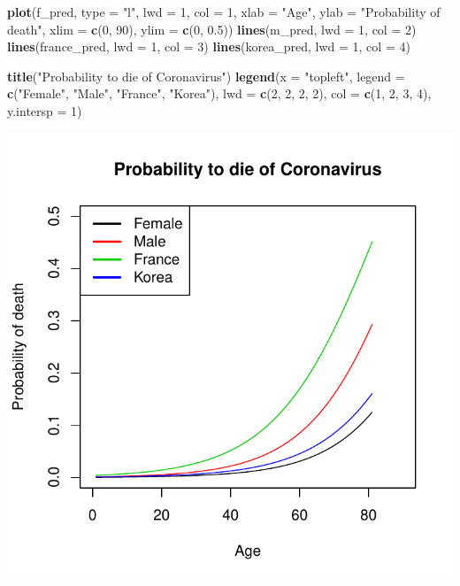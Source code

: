 \documentclass[
]{article}
\newenvironment{Shaded}{\begin{snugshade}}{\end{snugshade}}
\newcommand{\DataTypeTok}[1]{\textcolor[rgb]{0.13,0.29,0.53}{#1}}
\newcommand{\DecValTok}[1]{\textcolor[rgb]{0.00,0.00,0.81}{#1}}
\newcommand{\FloatTok}[1]{\textcolor[rgb]{0.00,0.00,0.81}{#1}}
\newcommand{\KeywordTok}[1]{\textcolor[rgb]{0.13,0.29,0.53}{\textbf{#1}}}
\newcommand{\NormalTok}[1]{#1}
\newcommand{\StringTok}[1]{\textcolor[rgb]{0.31,0.60,0.02}{#1}}
\begin{document}
\begin{Shaded}
\begin{Highlighting}[]
\KeywordTok{plot}\NormalTok{(f_pred, }\DataTypeTok{type =} \StringTok{"l"}\NormalTok{, }\DataTypeTok{lwd =} \DecValTok{1}\NormalTok{, }\DataTypeTok{col =} \DecValTok{1}\NormalTok{, }\DataTypeTok{xlab =} \StringTok{"Age"}\NormalTok{, }\DataTypeTok{ylab =} \StringTok{"Probability of death"}\NormalTok{, }
    \DataTypeTok{xlim =} \KeywordTok{c}\NormalTok{(}\DecValTok{0}\NormalTok{, }\DecValTok{90}\NormalTok{), }\DataTypeTok{ylim =} \KeywordTok{c}\NormalTok{(}\DecValTok{0}\NormalTok{, }\FloatTok{0.5}\NormalTok{))}
\KeywordTok{lines}\NormalTok{(m_pred, }\DataTypeTok{lwd =} \DecValTok{1}\NormalTok{, }\DataTypeTok{col =} \DecValTok{2}\NormalTok{)}
\KeywordTok{lines}\NormalTok{(france_pred, }\DataTypeTok{lwd =} \DecValTok{1}\NormalTok{, }\DataTypeTok{col =} \DecValTok{3}\NormalTok{)}
\KeywordTok{lines}\NormalTok{(korea_pred, }\DataTypeTok{lwd =} \DecValTok{1}\NormalTok{, }\DataTypeTok{col =} \DecValTok{4}\NormalTok{)}

\KeywordTok{title}\NormalTok{(}\StringTok{"Probability to die of Coronavirus"}\NormalTok{)}
\KeywordTok{legend}\NormalTok{(}\DataTypeTok{x =} \StringTok{"topleft"}\NormalTok{, }\DataTypeTok{legend =} \KeywordTok{c}\NormalTok{(}\StringTok{"Female"}\NormalTok{, }\StringTok{"Male"}\NormalTok{, }\StringTok{"France"}\NormalTok{, }\StringTok{"Korea"}\NormalTok{), }\DataTypeTok{lwd =} \KeywordTok{c}\NormalTok{(}\DecValTok{2}\NormalTok{, }
    \DecValTok{2}\NormalTok{, }\DecValTok{2}\NormalTok{, }\DecValTok{2}\NormalTok{), }\DataTypeTok{col =} \KeywordTok{c}\NormalTok{(}\DecValTok{1}\NormalTok{, }\DecValTok{2}\NormalTok{, }\DecValTok{3}\NormalTok{, }\DecValTok{4}\NormalTok{), }\DataTypeTok{y.intersp =} \DecValTok{1}\NormalTok{)}
\end{Highlighting}
\end{Shaded}

\includegraphics{Eksamensbesvarelse_files/figure-latex/unnamed-chunk-13-1.pdf}
\end{document}
